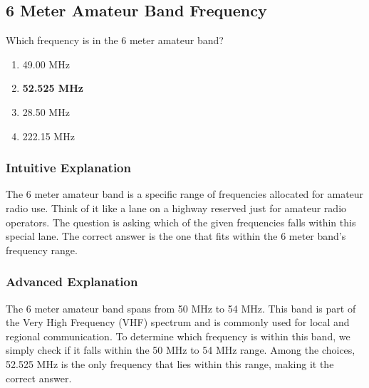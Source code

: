 \subsection{6 Meter Amateur Band Frequency}
\label{T1B03}

\begin{tcolorbox}[colback=gray!10!white,colframe=black!75!black,title=T1B03]
Which frequency is in the 6 meter amateur band?
\begin{enumerate}[label=\Alph*,noitemsep]
    \item 49.00 MHz
    \item \textbf{52.525 MHz}
    \item 28.50 MHz
    \item 222.15 MHz
\end{enumerate}
\end{tcolorbox}

\subsubsection*{Intuitive Explanation}
The 6 meter amateur band is a specific range of frequencies allocated for amateur radio use. Think of it like a lane on a highway reserved just for amateur radio operators. The question is asking which of the given frequencies falls within this special lane. The correct answer is the one that fits within the 6 meter band's frequency range.

\subsubsection*{Advanced Explanation}
The 6 meter amateur band spans from 50 MHz to 54 MHz. This band is part of the Very High Frequency (VHF) spectrum and is commonly used for local and regional communication. To determine which frequency is within this band, we simply check if it falls within the 50 MHz to 54 MHz range. Among the choices, 52.525 MHz is the only frequency that lies within this range, making it the correct answer.